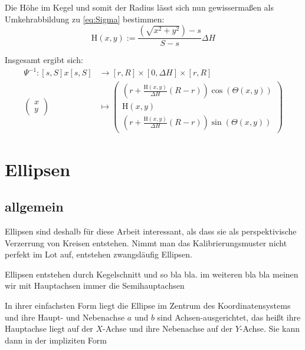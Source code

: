 Die Höhe  im Kegel und somit der Radius lässt sich nun gewissermaßen als Umkehrabbildung zu \ref{eq:Sigma} bestimmen:
\begin{equation*}
\mathrm{H}(x,y) := \frac{\left(\sqrt{x^2+y^2}\right) - s}{S - s}\Delta H
\end{equation*}

Insgesamt ergibt sich:
\begin{equation}
\begin{aligned}
\Psi^{-1} \colon  [s,S]x[s,S] &\to [r,R] \times [0, \Delta H] \times [r,R]\\
\begin{pmatrix}
x \\ y
\end{pmatrix} &\mapsto
\begin{pmatrix}
\left( r + \frac{\mathrm{H}(x,y)}{\Delta H} (R - r)\right)\cos\left(\Theta(x,y) \right) \\
\mathrm{H}(x,y)\\
\left( r + \frac{\mathrm{H}(x,y)}{\Delta H} (R - r)\right)\sin\left(\Theta(x,y) \right)
\end{pmatrix}
\end{aligned}
\end{equation}




\section{Ellipsen}
\subsection{allgemein}
Ellipsen sind deshalb für diese Arbeit interessant, als dass sie als perspektivische Verzerrung von Kreisen entstehen. Nimmt man das Kalibrierungsmuster nicht perfekt im Lot auf, entstehen zwangsläufig Ellipsen. 

\begin{definition}[Ellipse]
	Ellipsen entstehen durch 
	Kegelschnitt und so bla bla. im weiteren bla bla meinen wir mit Hauptachsen immer die Semihauptachsen
\end{definition}

In ihrer einfachsten Form liegt die Ellipse im Zentrum des Koordinatensystems und ihre Haupt- und Nebenachse $a$ und $b$ sind Achsen-ausgerichtet, das heißt ihre Hauptachse liegt auf der $X$-Achse und ihre Nebenachse auf der $Y$-Achse. Sie kann dann in der impliziten Form

